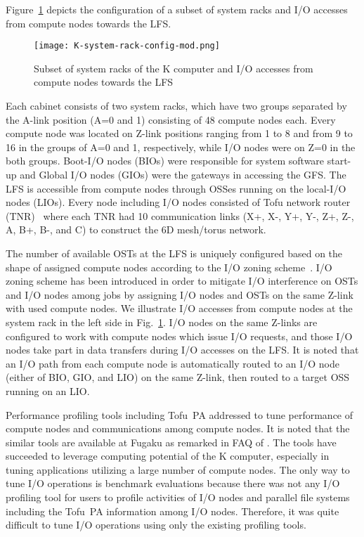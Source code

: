 \documentclass{jhps}
\begin{document}
Figure~\ref{fig:SUBSET_SYSRACK_K} depicts the configuration of a subset of system racks
and I/O accesses from compute nodes towards the LFS.
%
\begin{figure}[tb]
\centering
\texttt{[image: K-system-rack-config-mod.png]}
\caption{Subset of system racks of the K computer and I/O accesses from compute nodes
towards the LFS}
\label{fig:SUBSET_SYSRACK_K}
\end{figure}
%
Each cabinet consists of two system racks, which have two groups separated
by the A-link position (A=0 and 1) consisting of 48 compute nodes each.
Every compute node was located on Z-link positions ranging from 1 to 8 and
from 9 to 16 in the groups of A=0 and 1, respectively, while I/O nodes were
on Z=0 in the both groups.
Boot-I/O nodes (BIOs) were responsible for system software start-up and
Global I/O nodes (GIOs) were the gateways in accessing the GFS.
The LFS is accessible from compute nodes through OSSes running on the local-I/O nodes (LIOs).
Every node including I/O nodes consisted of Tofu network router (TNR)~\cite{tofu:micro2012}
where each TNR had 10 communication links (X+, X-, Y+, Y-, Z+, Z-, A, B+, B-, and C)
to construct the 6D mesh/torus network.

The number of available OSTs at the LFS is uniquely configured based on the shape of
assigned compute nodes according to the I/O zoning scheme~\cite{sumimoto:LUG2011}.
I/O zoning scheme has been introduced in order to mitigate I/O interference on OSTs
and I/O nodes among jobs by assigning I/O nodes and OSTs on the same Z-link
with used compute nodes.
We illustrate I/O accesses from compute nodes
at the system rack in the left side in Fig.~\ref{fig:SUBSET_SYSRACK_K}.
I/O nodes on the same Z-links are configured to work with compute nodes which
issue I/O requests, and those I/O nodes
take part in data transfers during I/O accesses on the LFS.
It is noted that an I/O path from each compute node is automatically routed to
an I/O node (either of BIO, GIO, and LIO) on the same Z-link,
then routed to a target OSS running on an LIO.

Performance profiling tools including Tofu~PA addressed to tune performance of compute nodes
and communications among compute nodes.
It is noted that the similar tools are available at Fugaku
as remarked in FAQ of \cite{fugaku_info:web}.
The tools have succeeded to leverage computing potential of the K computer,
especially in tuning applications utilizing a large number of compute nodes.
The only way to tune I/O operations is benchmark evaluations
because there was not any I/O profiling tool for users to profile activities
of I/O nodes and parallel file systems including the Tofu~PA information among I/O nodes.
Therefore, it was quite difficult to tune I/O operations using only the existing profiling tools.
\end{document}
